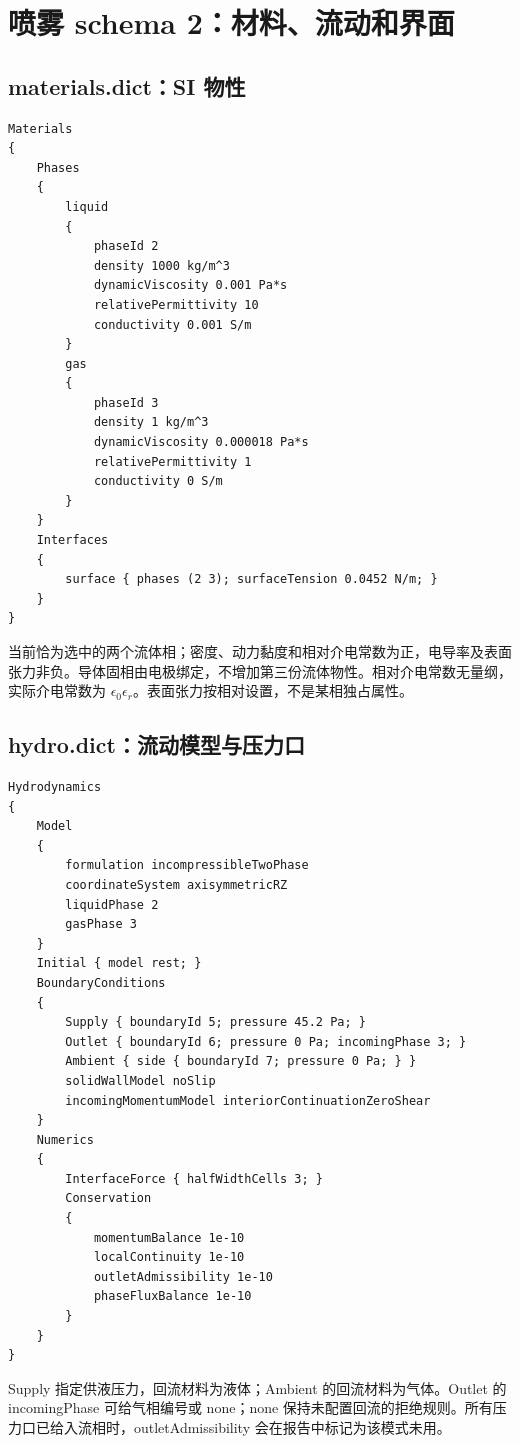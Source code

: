 \documentclass[a4paper,11pt]{article}
\begin{document}
\section{喷雾 schema 2：材料、流动和界面}
\subsection{materials.dict：SI 物性}
\begin{lstlisting}
Materials
{
    Phases
    {
        liquid
        {
            phaseId 2
            density 1000 kg/m^3
            dynamicViscosity 0.001 Pa*s
            relativePermittivity 10
            conductivity 0.001 S/m
        }
        gas
        {
            phaseId 3
            density 1 kg/m^3
            dynamicViscosity 0.000018 Pa*s
            relativePermittivity 1
            conductivity 0 S/m
        }
    }
    Interfaces
    {
        surface { phases (2 3); surfaceTension 0.0452 N/m; }
    }
}
\end{lstlisting}
当前恰为选中的两个流体相；密度、动力黏度和相对介电常数为正，电导率及表面张力非负。导体固相由电极绑定，不增加第三份流体物性。相对介电常数无量纲，实际介电常数为 $\epsilon_0\epsilon_r$。表面张力按相对设置，不是某相独占属性。

\subsection{hydro.dict：流动模型与压力口}
\begin{lstlisting}
Hydrodynamics
{
    Model
    {
        formulation incompressibleTwoPhase
        coordinateSystem axisymmetricRZ
        liquidPhase 2
        gasPhase 3
    }
    Initial { model rest; }
    BoundaryConditions
    {
        Supply { boundaryId 5; pressure 45.2 Pa; }
        Outlet { boundaryId 6; pressure 0 Pa; incomingPhase 3; }
        Ambient { side { boundaryId 7; pressure 0 Pa; } }
        solidWallModel noSlip
        incomingMomentumModel interiorContinuationZeroShear
    }
    Numerics
    {
        InterfaceForce { halfWidthCells 3; }
        Conservation
        {
            momentumBalance 1e-10
            localContinuity 1e-10
            outletAdmissibility 1e-10
            phaseFluxBalance 1e-10
        }
    }
}
\end{lstlisting}
Supply 指定供液压力，回流材料为液体；Ambient 的回流材料为气体。Outlet 的 incomingPhase 可给气相编号或 none；none 保持未配置回流的拒绝规则。所有压力口已给入流相时，outletAdmissibility 会在报告中标记为该模式未用。
\end{document}
